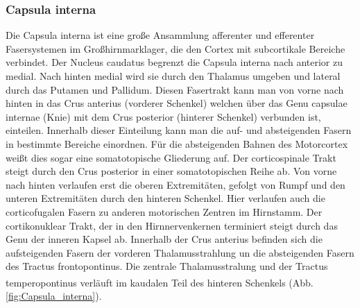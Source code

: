 \documentclass[12pt,a4paper,pdftex]{article}
\begin{document}
\subsubsection*{Capsula interna} 
Die Capsula interna ist eine große Ansammlung afferenter und efferenter Fasersystemen im Großhirnmarklager, die den Cortex mit subcortikale Bereiche verbindet. Der Nucleus caudatus begrenzt die Capsula interna nach anterior zu medial. Nach hinten medial wird sie durch den Thalamus umgeben und lateral durch das Putamen und Pallidum. Diesen Fasertrakt kann man von vorne nach hinten in das Crus anterius (vorderer Schenkel) welchen über das Genu capsulae internae (Knie) mit dem Crus posterior (hinterer Schenkel) verbunden ist, einteilen. Innerhalb dieser Einteilung kann man die auf- und absteigenden Fasern in bestimmte Bereiche einordnen. Für die absteigenden Bahnen des Motorcortex weißt dies sogar eine somatotopische Gliederung auf. Der corticospinale Trakt steigt durch den Crus posterior in einer somatotopischen Reihe ab. Von vorne nach hinten verlaufen erst die oberen Extremitäten, gefolgt von Rumpf und den unteren Extremitäten durch den hinteren Schenkel. Hier verlaufen auch die corticofugalen Fasern zu anderen motorischen Zentren im Hirnstamm. Der cortikonuklear Trakt, der in den Hirnnervenkernen terminiert steigt durch das Genu der inneren Kapsel ab. Innerhalb der Crus anterius befinden sich die aufsteigenden Fasern der vorderen Thalamusstrahlung un die absteigenden Fasern des Tractus frontopontinus. Die zentrale Thalamusstralung und der Tractus temperopontinus verläuft im kaudalen Teil des hinteren Schenkels \textsuperscript{\cite[9]{trepel2011neuroanatomie}} (Abb. \ref{fig:Capsula_interna}).
\end{document}
